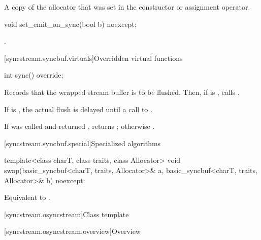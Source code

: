 \begin{itemdescr}
\pnum
\returns
A copy of the allocator that was set in the constructor or assignment operator.
\end{itemdescr}

%
\begin{itemdecl}
void set_emit_on_sync(bool b) noexcept;
\end{itemdecl}

\begin{itemdescr}
\pnum
\effects
{}.
\end{itemdescr}

[syncstream.syncbuf.virtuals]{Overridden virtual functions}

%
\begin{itemdecl}
int sync() override;
\end{itemdecl}

\begin{itemdescr}
\pnum
\effects
Records that the wrapped stream buffer is to be flushed.
Then, if  is , calls .
\begin{note}
If  is ,
the actual flush is delayed until a call to .
\end{note}

\pnum
\returns
If  was called and returned ,
returns ; otherwise .
\end{itemdescr}

[syncstream.syncbuf.special]{Specialized algorithms}

%
\begin{itemdecl}
template<class charT, class traits, class Allocator>
  void swap(basic_syncbuf<charT, traits, Allocator>& a,
            basic_syncbuf<charT, traits, Allocator>& b) noexcept;
\end{itemdecl}

\begin{itemdescr}
\pnum
\effects
Equivalent to .
\end{itemdescr}

[syncstream.osyncstream]{Class template }

[syncstream.osyncstream.overview]{Overview}

